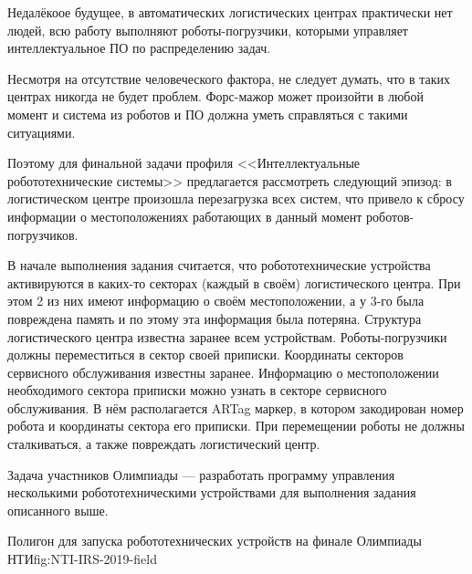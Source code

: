 Недалёкоое будущее, в автоматических логистических центрах практически нет людей, всю работу
выполняют роботы-погрузчики, которыми управляет интеллектуальное ПО по распределению задач.

Несмотря на отсутствие человеческого фактора, не следует думать, что в таких
центрах никогда не будет проблем. Форс-мажор может произойти в любой момент и система
из роботов и ПО должна уметь справляться с такими ситуациями.

Поэтому для финальной задачи профиля <<Интеллектуальные робототехнические системы>>
предлагается рассмотреть следующий эпизод: в логистическом центре произошла перезагрузка
всех систем, что привело к сбросу информации о местоположениях работающих в данный момент роботов-погрузчиков.

В начале выполнения задания считается, что робототехнические устройства активируются
в каких-то секторах (каждый в своём) логистического центра.
При этом 2 из них имеют информацию о своём местоположении,
а у 3-го была повреждена память и по этому эта информация была потеряна.
Структура логистического центра известна заранее всем устройствам.
Роботы-погрузчики должны переместиться в сектор своей приписки.
Координаты секторов сервисного обслуживания известны заранее.
Информацию о местоположении необходимого сектора приписки можно узнать в
секторе сервисного обслуживания. В нём располагается ARTag маркер, в котором закодирован номер робота и
координаты сектора его приписки. При перемещении роботы не должны сталкиваться, а
также повреждать логистический центр.


Задача участников Олимпиады --- разработать программу управления несколькими робототехническими
устройствами для выполнения задания описанного выше.

{Полигон для запуска робототехнических устройств на финале Олимпиады НТИ}{fig:NTI-IRS-2019-field}
